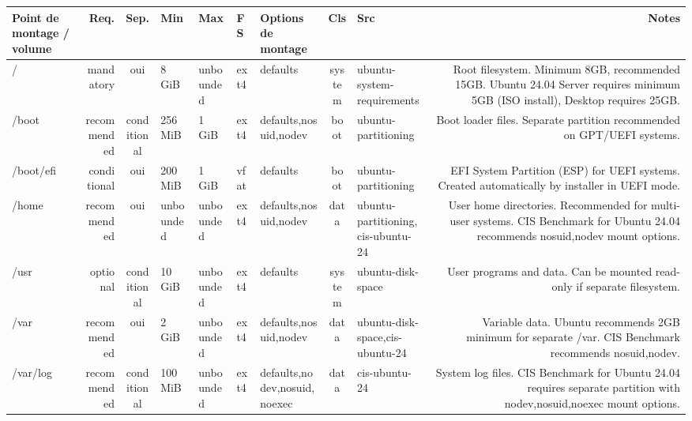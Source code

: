 \documentclass[10pt,a4paper]{article}
\renewcommand{\arraystretch}{1.2}
\begin{document}
{\renewcommand{\arraystretch}{1.15}\begin{longtable}{M R S Z Z T O C I N}\toprule\textbf{\normalfont\scriptsize Point de montage / volume} & \textbf{\normalfont\scriptsize Req.} & \textbf{\normalfont\scriptsize Sep.} & \textbf{\normalfont\scriptsize Min} & \textbf{\normalfont\scriptsize Max} & \textbf{\normalfont\scriptsize FS} & \textbf{\normalfont\scriptsize Options de montage} & \textbf{\normalfont\scriptsize Cls} & \textbf{\normalfont\scriptsize Src} & \textbf{\normalfont\scriptsize Notes}\\\midrule\endhead
/ & \textcolor{cBlock}{mandatory} & \textcolor{cOk}{oui} & 8 GiB & unbounded & ext4 & defaults & system & ubuntu-system-requirements & Root filesystem. Minimum 8GB, recommended 15GB. Ubuntu 24.04 Server requires minimum 5GB (ISO install), Desktop requires 25GB.\\
/boot & \textcolor{cHigh}{recommended} & conditional & 256 MiB & 1 GiB & ext4 & defaults,nosuid,nodev & boot & ubuntu-partitioning & Boot loader files. Separate partition recommended on GPT/UEFI systems.\\
/boot/efi & \textcolor{cMed}{conditional} & \textcolor{cOk}{oui} & 200 MiB & 1 GiB & vfat & defaults & boot & ubuntu-partitioning & EFI System Partition (ESP) for UEFI systems. Created automatically by installer in UEFI mode.\\
/home & \textcolor{cHigh}{recommended} & \textcolor{cOk}{oui} & unbounded & unbounded & ext4 & defaults,nosuid,nodev & data & ubuntu-partitioning,cis-ubuntu-24 & User home directories. Recommended for multi-user systems. CIS Benchmark for Ubuntu 24.04 recommends nosuid,nodev mount options.\\
/usr & \textcolor{cLow}{optional} & conditional & 10 GiB & unbounded & ext4 & defaults & system & ubuntu-disk-space & User programs and data. Can be mounted read-only if separate filesystem.\\
/var & \textcolor{cHigh}{recommended} & \textcolor{cOk}{oui} & 2 GiB & unbounded & ext4 & defaults,nosuid,nodev & data & ubuntu-disk-space,cis-ubuntu-24 & Variable data. Ubuntu recommends 2GB minimum for separate /var. CIS Benchmark recommends nosuid,nodev.\\
/var/log & \textcolor{cHigh}{recommended} & conditional & 100 MiB & unbounded & ext4 & defaults,nodev,nosuid,noexec & data & cis-ubuntu-24 & System log files. CIS Benchmark for Ubuntu 24.04 requires separate partition with nodev,nosuid,noexec mount options.\\

\end{longtable}}
\end{document}
